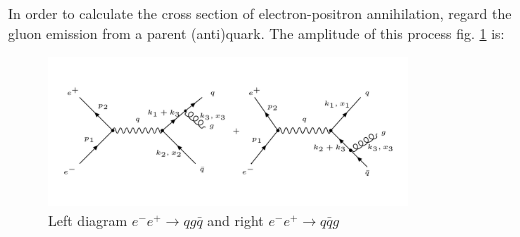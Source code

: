 In order to calculate the cross section of electron-positron annihilation, regard the gluon emission from a parent (anti)quark. The amplitude of this process fig. \ref{IRCo} is:
\begin{figure}[h!]
\centering
\includegraphics[width=0.85\textwidth]{images/Intro/IRColMatrix.png}
\caption{Left diagram $  e^- e^+ \rightarrow qg\bar{q} $ and right $ e^- e^+ \rightarrow q\bar{q}g $}
\label{IRCo}
\end{figure}

